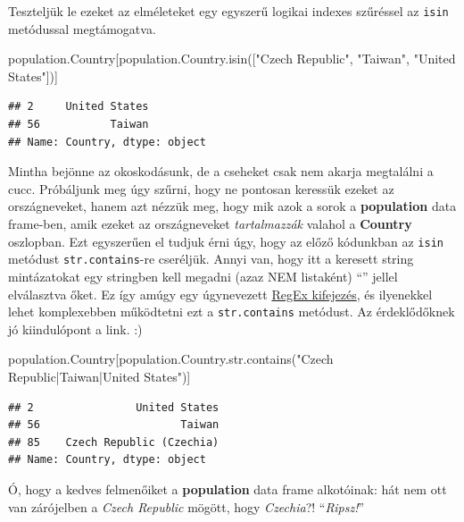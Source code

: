 \documentclass[
]{book}
\newenvironment{Shaded}{\begin{snugshade}}{\end{snugshade}}
\newcommand{\BuiltInTok}[1]{#1}
\newcommand{\NormalTok}[1]{#1}
\newcommand{\StringTok}[1]{\textcolor[rgb]{0.31,0.60,0.02}{#1}}
\begin{document}
Teszteljük le ezeket az elméleteket egy egyszerű logikai indexes szűréssel az \texttt{isin} metódussal megtámogatva.

\begin{Shaded}
\begin{Highlighting}[]
\NormalTok{population.Country[population.Country.isin([}\StringTok{"Czech Republic"}\NormalTok{, }\StringTok{"Taiwan"}\NormalTok{, }\StringTok{"United States"}\NormalTok{])]}
\end{Highlighting}
\end{Shaded}

\begin{verbatim}
## 2     United States
## 56           Taiwan
## Name: Country, dtype: object
\end{verbatim}

Mintha bejönne az okoskodásunk, de a cseheket csak nem akarja megtalálni a cucc. Próbáljunk meg úgy szűrni, hogy ne pontosan keressük ezeket az országneveket, hanem azt nézzük meg, hogy mik azok a sorok a \textbf{population} data frame-ben, amik ezeket az országneveket \emph{tartalmazzák} valahol a \textbf{Country} oszlopban.
Ezt egyszerűen el tudjuk érni úgy, hogy az előző kódunkban az \texttt{isin} metódust \texttt{str.contains}-re cseréljük. Annyi van, hogy itt a keresett string mintázatokat egy stringben kell megadni (azaz NEM listaként) ``\textbar{}'' jellel elválasztva őket.
Ez így amúgy egy úgynevezett \href{http://vbence.web.elte.hu/regex_leiras.html}{RegEx kifejezés}, és ilyenekkel lehet komplexebben működtetni ezt a \texttt{str.contains} metódust. Az érdeklődőknek jó kiindulópont a link. :)

\begin{Shaded}
\begin{Highlighting}[]
\NormalTok{population.Country[population.Country.}\BuiltInTok{str}\NormalTok{.contains(}\StringTok{"Czech Republic|Taiwan|United States"}\NormalTok{)]}
\end{Highlighting}
\end{Shaded}

\begin{verbatim}
## 2                United States
## 56                      Taiwan
## 85    Czech Republic (Czechia)
## Name: Country, dtype: object
\end{verbatim}

Ó, hogy a kedves felmenőiket a \textbf{population} data frame alkotóinak: hát nem ott van zárójelben a \emph{Czech Republic} mögött, hogy \emph{Czechia}?! ``\emph{Ripsz!}''
\end{document}
